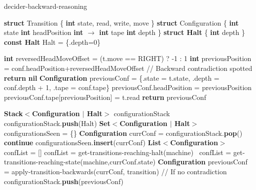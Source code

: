 \begin{algorithm}
  \caption{{\sc decider-backward-reasoning}}\label{alg:backward-reasoning}

  \begin{algorithmic}[1]
    \State \textbf{struct} Transition \{
      \State \tabi\textbf{int} state, read, write, move
      \State \}
          \State \textbf{struct} Configuration \{
          \State \tabi\textbf{int} state
          \State \tabi\textbf{int} headPosition
          \State \tabi\textbf{int $\boldsymbol{\to}$ int} tape
          \State \tabi\textbf{int} depth
          \State \}
          \State \textbf{struct Halt} \{ \textbf{int} depth \}
          \State \textbf{const Halt} Halt = \{.depth=0\}
          \State
          
          \State \textbf{int} reversedHeadMoveOffset = (t.move == RIGHT) ? -1 : 1
          \State \textbf{int} previousPosition = conf.headPosition+reversedHeadMoveOffset
          \State // Backward contradiction spotted
          \State \textbf{return} \textbf{nil}
          \EndIf
          \State \textbf{Configuration} previousConf = \{.state = t.state, .depth = conf.depth + 1, .tape = conf.tape\}
          \State previousConf.headPosition = previousPosition
          \State previousConf.tape[previousPosition] = t.read
          \State \textbf{return} previousConf
          \EndProcedure
          \State
          
          \State \textbf{Stack$\boldsymbol{<}$Configuration $|$ Halt$\boldsymbol{>}$} configurationStack
          \State configurationStack.\textbf{push}(Halt)
          \State \textbf{Set$\boldsymbol{<}$Configuration $|$ Halt$\boldsymbol{>}$} configurationsSeen = \{\}
          \State \textbf{Configuration} currConf = configurationStack.\textbf{pop}()
           \textbf{continue} \EndIf
          \State configurationsSeen.\textbf{insert}(currConf)
          \State \textbf{List$\boldsymbol{<}$Configuration$\boldsymbol{>}$} confList = []
          confList = {\sc get-transitions-reaching-halt}(machine)
          \Else \ confList = {\sc get-transitions-reaching-state}(machine,currConf.state)
          \EndIf
          \State \textbf{Configuration} previousConf = {\sc apply-transition-backwards}(currConf, transition)
          \State // If no contradiction
          \State configurationStack.\textbf{push}(previousConf)
          \EndIf
          \EndFor
          \EndWhile


\end{algorithmic}
\end{algorithm}
